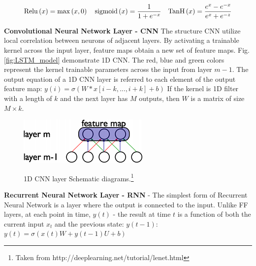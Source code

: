 \documentclass[
12pt, %
english, %
doublespacing, %
headsepline, %
]{MastersDoctoralThesis} %
\begin{document}
\[{\rm{Relu}}\left( x \right) = \max \left( {x,0} \right)\,\,\,\,\,\,{\rm{sigmoid}}\left( x \right) = \frac{1}{{1 + {e^{ - x}}}}\,\,\,\,\,\,{\mathop{\rm Tan}\nolimits} {\rm{H}}\left( x \right) = \frac{{{e^x} - {e^{ - x}}}}{{{e^x} + {e^{ - z}}}}\]




 
 
 
\textbf{Convolutional Neural Network Layer - CNN } The structure CNN utilize local correlation between neurons of adjacent layers. By activating a trainable kernel across the input layer, feature maps obtain a new set of feature maps. Fig.\ref{fig:LSTM_model} demonstrate 1D CNN. The red, blue and green colors represent the kernel trainable parameters across the input from layer $m-1$. The output equation of a 1D CNN layer is referred to each element of the output feature map: 
$y\left( i \right) = \sigma \left( {W * x\left[ {i - k,...,i + k} \right] + b} \right)$
If the kernel is 1D filter with a length of $k$ and the next layer has $M$ outputs, then $W$ is a matrix of size $M \times k$.

\begin{figure}[t]
			\centering
			\includegraphics{conv_1D_nn.png}
			\label{fig:1D_CNN_layer}
	\caption[1D CNN layer Schematic diagrams]{1D CNN layer Schematic diagrams.\footnote{Taken from http://deeplearning.net/tutorial/lenet.html}}
\end{figure}




\textbf{Recurrent Neural Network Layer - RNN} - The simplest form of Recurrent Neural Network \cite{rumelhart1985learning, werbos1988generalization} is a layer where the output is connected to the input. Unlike FF layers, at each point in time, $y(t)$ - the result at time $t$ is a function of both the current input $x_t$ and the previous state: 
$y(t-1)$:  
	$y\left( t \right) = \sigma \left( {x\left( t \right)W + y\left( {t - 1} \right)U + b} \right)$
\end{document}
